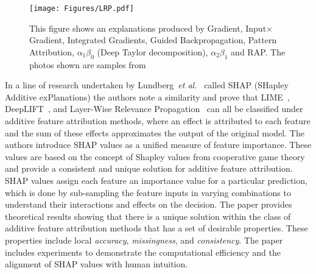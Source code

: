 \begin{figure}[ht!]
	\begin{center}
		\texttt{[image: Figures/LRP.pdf]}
	\end{center}
	\caption{This figure shows an explanations produced by Gradient, Input$\times$Gradient, Integrated Gradients, Guided Backpropagation, Pattern Attribution, \LRP$\alpha_1\beta_0$ (Deep Taylor decomposition), \LRP$\alpha_2\beta_1$ and RAP. The photos shown are samples from~\cite{NamGCWL20}}
	\label{Fig:VAE}
\end{figure} 



In a line of research undertaken by Lundberg~\textit{et al.}~\cite{LundbergL17} called SHAP (SHapley Additive exPlanations) the authors note a similarity and prove that LIME~\cite{Ribeiro0G16}, DeepLIFT~\cite{ShrikumarGK17}, and Layer-Wise Relevance Propagation~\cite{bach2015pixel} can all be classified under additive feature attribution methods, where an effect is attributed to each feature and the sum of these effects approximates the output of the original model. The authors introduce SHAP values as a unified measure of feature importance. These values are based on the concept of Shapley values from cooperative game theory and provide a consistent and unique solution for additive feature attribution. SHAP values assign each feature an importance value for a particular prediction, which is done by sub-sampling the feature inputs in varying combinations to understand their interactions and effects on the decision. The paper provides theoretical results showing that there is a unique solution within the class of additive feature attribution methods that has a set of desirable properties. These properties include local \emph{accuracy}, \emph{missingness}, and \emph{consistency}. The paper includes experiments to demonstrate the computational efficiency and the alignment of SHAP values with human intuition. 


